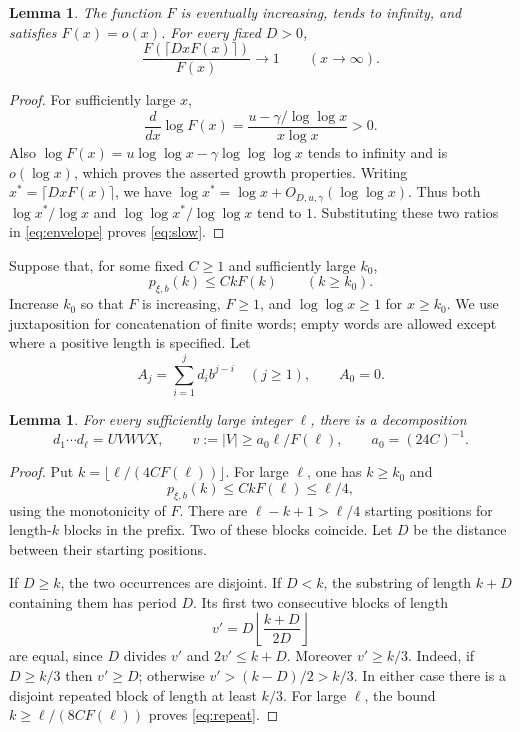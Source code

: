 \documentclass[11pt]{article}
\numberwithin{equation}{section}
\newtheorem{lemma}[theorem]{Lemma}
\theoremstyle{remark}
\begin{document}
\begin{lemma}\label{lem:envelope}
The function $F$ is eventually increasing, tends to infinity, and
satisfies $F(x)=o(x)$. For every fixed $D>0$,
\begin{equation}\label{eq:slow}
 \frac{F(\lceil DxF(x)\rceil)}{F(x)}\longrightarrow1
 \qquad(x\to\infty).
\end{equation}
\end{lemma}
\begin{proof}
For sufficiently large $x$,
\[
 \frac{d}{dx}\log F(x)
 =\frac{u-\gamma/\log\log x}{x\log x}>0.
\]
Also $\log F(x)=u\log\log x-\gamma\log\log\log x$ tends to infinity
and is $o(\log x)$, which proves the asserted growth properties.
Writing $x^*=\lceil DxF(x)\rceil$, we have
$\log x^*=\log x+O_{D,u,\gamma}(\log\log x)$.
Thus both $\log x^*/\log x$ and
$\log\log x^*/\log\log x$ tend to $1$. Substituting these two ratios
in \eqref{eq:envelope} proves \eqref{eq:slow}.
\end{proof}

Suppose that, for some fixed $C\ge1$ and sufficiently large $k_0$,
\begin{equation}\label{eq:LC}
 p_{\xi,b}(k)\le CkF(k)\qquad(k\ge k_0).
\end{equation}
Increase $k_0$ so that $F$ is increasing, $F\ge1$, and
$\log\log x\ge1$ for $x\ge k_0$.
We use juxtaposition for concatenation of finite words; empty words are
allowed except where a positive length is specified.
Let
\[
 A_j=\sum_{i=1}^j d_i b^{j-i}\quad(j\ge1),\qquad A_0=0.
\]

\begin{lemma}\label{lem:repeat}
For every sufficiently large integer $\ell$, there is a decomposition
\begin{equation}\label{eq:repeat}
 d_1\cdots d_\ell=UVWVX,\qquad
 v:=|V|\ge a_0\ell/F(\ell),\qquad a_0=(24C)^{-1}.
\end{equation}
\end{lemma}
\begin{proof}
Put $k=\lfloor\ell/(4CF(\ell))\rfloor$.
For large $\ell$, one has $k\ge k_0$ and
\[
 p_{\xi,b}(k)\le CkF(\ell)\le\ell/4,
\]
using the monotonicity of $F$.
There are $\ell-k+1>\ell/4$ starting positions for length-$k$ blocks in
the prefix. Two of these blocks coincide. Let $D$ be the distance
between their starting positions.

If $D\ge k$, the two occurrences are disjoint.
If $D<k$, the substring of length $k+D$ containing them has period $D$.
Its first two consecutive blocks of length
\[
 v'=D\left\lfloor\frac{k+D}{2D}\right\rfloor
\]
are equal, since $D$ divides $v'$ and $2v'\le k+D$.
Moreover $v'\ge k/3$. Indeed, if $D\ge k/3$ then $v'\ge D$;
otherwise $v'>(k-D)/2>k/3$.
In either case there is a disjoint repeated block of length at least
$k/3$. For large $\ell$, the bound
$k\ge\ell/(8CF(\ell))$ proves \eqref{eq:repeat}.
\end{proof}
\end{document}
